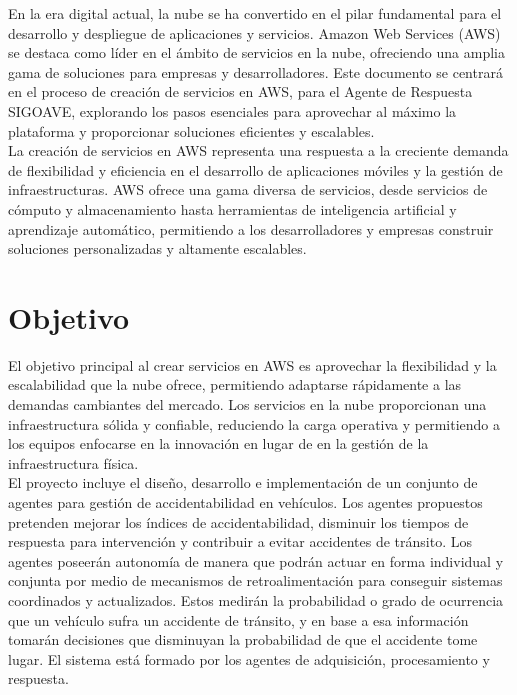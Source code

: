 \documentclass[a4paper,10pt, oneside, titlepage]{article}
\begin{document}
	\indent En la era digital actual, la nube se ha convertido en el pilar fundamental para el desarrollo y despliegue de aplicaciones y servicios. Amazon Web Services (AWS) se destaca como líder en el ámbito de servicios en la nube, ofreciendo una amplia gama de soluciones para empresas y desarrolladores. Este documento se centrará en el proceso de creación de servicios en AWS, para el Agente de Respuesta SIGOAVE, explorando los pasos esenciales para aprovechar al máximo la plataforma y proporcionar soluciones eficientes y escalables. \\\newline
	\indent La creación de servicios en AWS representa una respuesta a la creciente demanda de flexibilidad y eficiencia en el desarrollo de aplicaciones móviles y la gestión de infraestructuras. AWS ofrece una gama diversa de servicios, desde servicios de cómputo y almacenamiento hasta herramientas de inteligencia artificial y aprendizaje automático, permitiendo a los desarrolladores y empresas construir soluciones personalizadas y altamente escalables.
	
	\section{Objetivo}
	El objetivo principal al crear servicios en AWS es aprovechar la flexibilidad y la escalabilidad que la nube ofrece, permitiendo adaptarse rápidamente a las demandas cambiantes del mercado. Los servicios en la nube proporcionan una infraestructura sólida y confiable, reduciendo la carga operativa y permitiendo a los equipos enfocarse en la innovación en lugar de en la gestión de la infraestructura física. \\\newline
	\indent El proyecto incluye el diseño, desarrollo e implementación de un conjunto de agentes para gestión de accidentabilidad en vehículos. Los agentes propuestos pretenden mejorar los índices de accidentabilidad, disminuir los tiempos de respuesta para intervención y contribuir a evitar accidentes de tránsito. Los agentes poseerán autonomía de manera que podrán actuar en forma individual y conjunta por medio de mecanismos de retroalimentación para conseguir sistemas coordinados y actualizados. Estos medirán la probabilidad o grado de ocurrencia que un vehículo sufra un accidente de tránsito, y en base a esa información tomarán decisiones que disminuyan la probabilidad de que el accidente tome lugar. El sistema está formado por los agentes de adquisición, procesamiento y respuesta.
\end{document}
